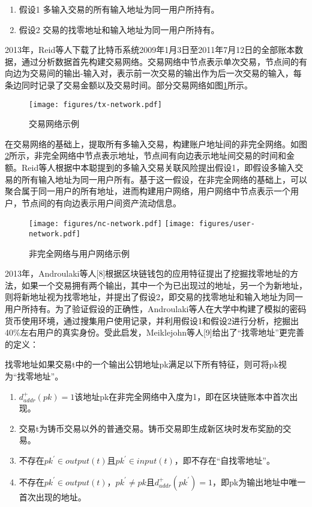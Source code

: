 \begin{enumerate}
	\item 假设1 多输入交易的所有输入地址为同一用户所持有。
	\item 假设2 交易的找零地址和输入地址为同一用户所持有。
\end{enumerate}

2013年，Reid等人下载了比特币系统2009年1月3日至2011年7月12日的全部账本数据，通过分析数据首先构建交易网络。交易网络中节点表示单次交易，节点间的有向边为交易间的输出-输入对，表示前一次交易的输出作为后一次交易的输入，每条边同时记录了交易金额以及交易时间。部分交易网络如图\ref{fig:tx-network}所示。

\begin{figure}
\centering
\texttt{[image: figures/tx-network.pdf]}
\caption{交易网络示例}
\label{fig:tx-network}
\end{figure}

在交易网络的基础上，提取所有多输入交易，构建账户地址间的非完全网络。如图\ref{fig:nc-user-network}所示，非完全网络中节点表示地址，节点间有向边表示地址间交易的时间和金额。Reid等人根据中本聪提到的多输入交易关联风险提出假设1，即假设多输入交易的所有输入地址为同一用户所有。基于这一假设，在非完全网络的基础上，可以聚合属于同一用户的所有地址，进而构建用户网络，用户网络中节点表示一个用户，节点间的有向边表示用户间资产流动信息。

\begin{figure}[H]
  \centering
    {\texttt{[image: figures/nc-network.pdf]}}
  \hspace{4em}
  	{\texttt{[image: figures/user-network.pdf]}}
  \caption{非完全网络与用户网络示例}
  \label{fig:nc-user-network}
\end{figure}

2013年，Androulaki等人[8]根据区块链钱包的应用特征提出了挖掘找零地址的方法，如果一个交易拥有两个输出，其中一个为已出现过的地址，另一个为新地址，则将新地址视为找零地址，并提出了假设2，即交易的找零地址和输入地址为同一用户所持有。为了验证假设的正确性，Androulaki等人在大学中构建了模拟的密码货币使用环境，通过搜集用户使用记录，并利用假设1和假设2进行分析，挖掘出40\%左右用户的真实身份。受此启发，Meiklejohn等人[9]给出了“找零地址”更完善的定义：
	
找零地址如果交易t中的一个输出公钥地址pk满足以下所有特征，则可将pk视为“找零地址”。

\begin{enumerate}
	\item $d_{addr}^{+}	\left(pk \right) = 1$该地址pk在非完全网络中入度为1，即在区块链账本中首次出现。
	\item 交易t为铸币交易以外的普通交易。铸币交易即生成新区块时发布奖励的交易。
	\item 不存在$pk^{'}\in  output \left(t \right)$且$pk^{'}\in  input \left( t \right)$，即不存在“自找零地址”。
	\item 不存在$pk^{'}\in  output \left( t \right)$，$pk^{'} \neq pk$且$d_{addr}^{+} \left( pk^{'} \right) = 1$，即pk为输出地址中唯一首次出现的地址。
\end{enumerate}

